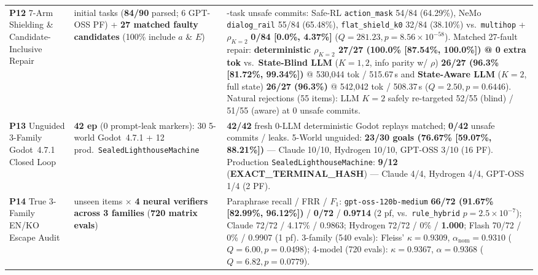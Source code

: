 \begin{table}[!tbp]
\begin{tabularx}{\textwidth}{@{}>{\raggedright\arraybackslash}p{}>{\raggedright\arraybackslash}p{}>{\raggedright\arraybackslash}X@{}}
\textbf{P12} 7-Arm Shielding \& Candidate-Inclusive Repair & 90 initial tasks (\textbf{84/90} parsed; 6 GPT-OSS PF) + \textbf{27 matched faulty candidates} (100\% include $a$ \& $E$) & 84-task unsafe commits: Safe-RL \texttt{action\_mask} 54/84 (64.29\%), NeMo \texttt{dialog\_rail} 55/84 (65.48\%), \texttt{flat\_shield\_k0} 32/84 (38.10\%) vs.\ \texttt{multihop} + $\rho_{K=2}$ \textbf{0/84 [0.0\%, 4.37\%]} ($Q{=}281.23, p{=}8.56{\times}10^{-58}$). Matched 27-fault repair: \textbf{deterministic $\rho_{K=2}$ 27/27 (100.0\% [87.54\%, 100.0\%]) @ 0 extra tok} vs.\ \textbf{State-Blind LLM} ($K{=}1,2$, info parity w/ $\rho$) \textbf{26/27 (96.3\% [81.72\%, 99.34\%])} @ 530,044 tok / 515.67\,s and \textbf{State-Aware LLM} ($K{=}2$, full state) \textbf{26/27 (96.3\%)} @ 542,042 tok / 508.37\,s ($Q{=}2.50, p{=}0.6446$). Natural rejections (55 items): LLM $K{=}2$ safely re-targeted 52/55 (blind) / 51/55 (aware) at 0 unsafe commits. \\
\textbf{P13} Unguided 3-Family Godot~4.7.1 Closed Loop & \textbf{42 ep} (0 prompt-leak markers): 30 5-world Godot~4.7.1 + 12 prod.\ \texttt{SealedLighthouseMachine} & \textbf{42/42} fresh 0-LLM deterministic Godot replays matched; \textbf{0/42} unsafe commits / leaks. 5-World unguided: \textbf{23/30 goals (76.67\% [59.07\%, 88.21\%])} — Claude 10/10, Hydrogen 10/10, GPT-OSS 3/10 (16 PF). Production \texttt{SealedLighthouseMachine}: \textbf{9/12} (\textbf{EXACT\_TERMINAL\_HASH}) — Claude 4/4, Hydrogen 4/4, GPT-OSS 1/4 (2 PF). \\
\textbf{P14} True 3-Family EN/KO Escape Audit & 180 unseen items $\times$ \textbf{4 neural verifiers across 3 families} (\textbf{720 matrix evals}) & Paraphrase recall / FRR / $F_1$: \texttt{gpt-\allowbreak oss-\allowbreak 120b-\allowbreak medium} \textbf{66/72 (91.67\% [82.99\%, 96.12\%])} / \textbf{0/72} / \textbf{0.9714} (2 pf, vs.\ \texttt{rule\_hybrid} $p{=}2.5{\times}10^{-7}$); Claude 72/72 / 4.17\% / 0.9863; Hydrogen 72/72 / 0\% / \textbf{1.000}; Flash 70/72 / 0\% / 0.9907 (1 pf). 3-family (540 evals): Fleiss' $\kappa{=}\mathbf{0.9309}$, $\alpha_{\mathrm{nom}}{=}\mathbf{0.9310}$ ($Q{=}6.00, p{=}0.0498$); 4-model (720 evals): $\kappa{=}\mathbf{0.9367}$, $\alpha{=}\mathbf{0.9368}$ ($Q{=}6.82, p{=}0.0779$). \\
\bottomrule
\end{tabularx}
\end{table}

